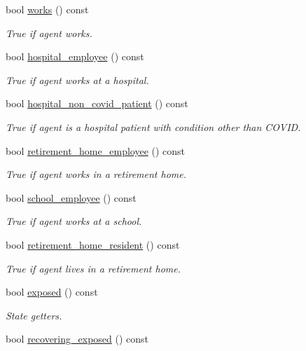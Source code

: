 \begin{DoxyCompactItemize}
bool \hyperlink{classAgent_ab587c852bf9894f46b073f77fad42719}{works} () const
\begin{DoxyCompactList}\small\item\em True if agent works. \end{DoxyCompactList}\item 
bool \hyperlink{classAgent_a6a56ebd7762964bcfe5033aa03c519b7}{hospital\+\_\+employee} () const
\begin{DoxyCompactList}\small\item\em True if agent works at a hospital. \end{DoxyCompactList}\item 
bool \hyperlink{classAgent_a6ed91d3d0a946999ab67241776ff928f}{hospital\+\_\+non\+\_\+covid\+\_\+patient} () const
\begin{DoxyCompactList}\small\item\em True if agent is a hospital patient with condition other than C\+O\+V\+ID. \end{DoxyCompactList}\item 
bool \hyperlink{classAgent_a6283111c121ebf8985810b69a51eb951}{retirement\+\_\+home\+\_\+employee} () const
\begin{DoxyCompactList}\small\item\em True if agent works in a retirement home. \end{DoxyCompactList}\item 
bool \hyperlink{classAgent_a47890cf31361127f97856265d1ea0576}{school\+\_\+employee} () const
\begin{DoxyCompactList}\small\item\em True if agent works at a school. \end{DoxyCompactList}\item 
bool \hyperlink{classAgent_aa38f589ea0afe69b5079c559862bff19}{retirement\+\_\+home\+\_\+resident} () const
\begin{DoxyCompactList}\small\item\em True if agent lives in a retirement home. \end{DoxyCompactList}\item 
bool \hyperlink{classAgent_a17ab356b10fd5841a6678bd678d1f598}{exposed} () const
\begin{DoxyCompactList}\small\item\em State getters. \end{DoxyCompactList}\item 
bool \hyperlink{classAgent_a221f1afb3791e0f0fa9eaccaea2d00cb}{recovering\+\_\+exposed} () const

\end{DoxyCompactItemize}
